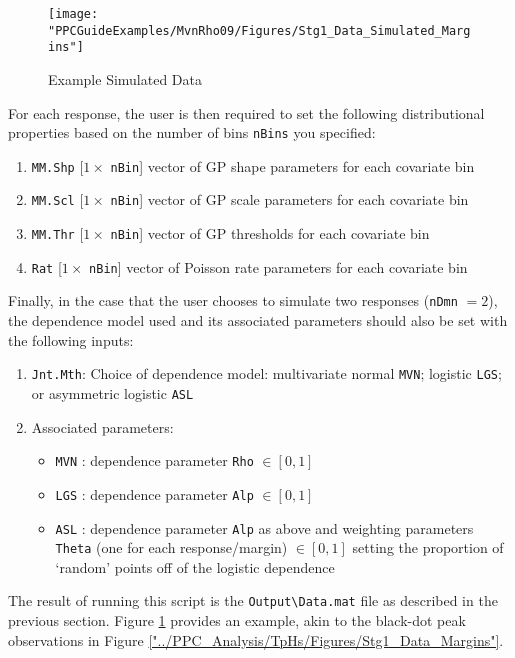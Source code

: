 \begin{figure}
\centering
\texttt{[image: "PPCGuideExamples/MvnRho09/Figures/Stg1\_Data\_Simulated\_Margins"]}
\caption{Example Simulated Data}
\label{fig:Stg1_Data_Simulated_Margins}
\end{figure}
For each response, the user is then required to set the following distributional properties based on the number of bins \verb+nBins+ you specified:
\begin{enumerate}
\item \verb+MM.Shp+ [$1 \times $ \verb+nBin+] vector of GP shape parameters for each covariate bin
\item \verb+MM.Scl+ [$1 \times $ \verb+nBin+] vector of GP scale parameters for each covariate bin
\item \verb+MM.Thr+ [$1 \times $ \verb+nBin+] vector of GP thresholds for each covariate bin 
\item	\verb+Rat+ [$1 \times $ \verb+nBin+]  vector of Poisson rate parameters for each covariate bin
\end{enumerate}
Finally, in the case that the user chooses to simulate two responses (\verb+nDmn+ $=2$), the dependence model used and its associated parameters should also be set with the following inputs:
\begin{enumerate}
\item \verb+Jnt.Mth+: Choice of dependence model: multivariate normal \verb+MVN+; logistic \verb+LGS+; or asymmetric logistic \verb+ASL+
\item Associated parameters:
   \begin{itemize}
      \item\verb+MVN+ : dependence parameter \verb+Rho+ $ \in [0,1]$
      \item \verb+LGS+ : dependence parameter \verb+Alp+  $\in [0,1]$
      \item	\verb+ASL+ : dependence parameter \verb+Alp+  as above and weighting parameters \verb+Theta+ (one for each response/margin) $\in [0,1]$ setting the proportion of `random' points off of the logistic dependence
   \end{itemize}
\end{enumerate}

The result of running this script is the \verb|Output\Data.mat| file as described in the previous section. Figure \ref{fig:Stg1_Data_Simulated_Margins} provides an example, akin to the black-dot peak observations in Figure \ref{"../PPC_Analysis/TpHs/Figures/Stg1_Data_Margins"}. 


